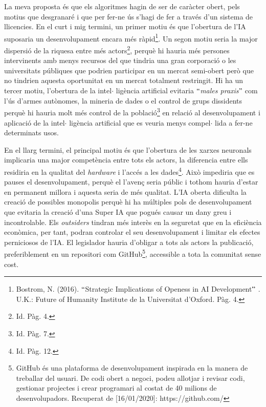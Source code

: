\documentclass[12pt]{article}
\begin{document}
\vspace{\baselineskip}
\begin{justify}
La meva proposta és que els algoritmes hagin de ser de caràcter obert,  pels motius que desgranaré i  que per fer-ne ús s’hagi de fer a través d’un sistema de llicencies.  En el curt i mig termini, un primer motiu és que l’obertura de l’IA suposaria un desenvolupament encara més ràpid\footnote{ Bostrom, N. (2016). $``$Strategic Implications of Openess in AI Development$"$ . U.K.: Future of Humanity Institute de la Universitat d’Oxford. Pàg. 4.  }. Un segon motiu seria la major dispersió de la riquesa entre més actors\footnote{ Id. Pàg. 4. }, perquè hi hauria més persones intervinents amb menys recursos del que tindria una gran corporació o les universitats públiques que podrien participar en un mercat semi-obert però que no tindrien aquesta oportunitat en un mercat totalment restringit. Hi ha un tercer motiu, l’obertura de la intel$ \cdot $ ligència artificial evitaria \textit{$``$males praxis$"$ } com l’ús d’armes autònomes, la mineria de dades o el control de grups dissidents perquè hi hauria molt més control de la població\footnote{ Id. Pàg. 7. } en relació al desenvolupament i aplicació de la intel$ \cdot $ ligència artificial que es veuria menys compel$ \cdot $ lida a fer-ne determinats usos.
\end{justify}\par


\vspace{\baselineskip}
\begin{justify}
En el llarg termini, el principal motiu és que l’obertura de les xarxes neuronals implicaria una major competència entre tots els actors, la diferencia entre ells residiria en la qualitat del \textit{hardware }i l’accés a les dades\footnote{ Id. Pàg. 12. }. Això impediria que es pauses el desenvolupament, perquè el l’avenç seria públic i tothom hauria d’estar en permanent millora i aquesta seria de més qualitat. L’IA oberta dificulta la creació de possibles monopolis perquè hi ha múltiples pols de desenvolupament que evitaria la creació d’una Super IA que pogués causar un dany greu i incontrolable. Els \textit{outsiders} tindran més interès en la seguretat que en la eficiència econòmica, per tant, podran controlar el seu desenvolupament i limitar els efectes perniciosos de l’IA. El legislador hauria d’obligar a tots als actors la publicació, preferiblement en un repositori com GitHub\footnote{ GitHub és una plataforma de desenvolupament inspirada en la manera de treballar del usuari. De codi obert a negoci, podeu allotjar i revisar codi, gestionar projectes i crear programari al costat de 40 milions de desenvolupadors. Recuperat de [16/01/2020]: https://github.com/ }, accessible a tota la comunitat sense cost.
\end{justify}\par
\end{document}
